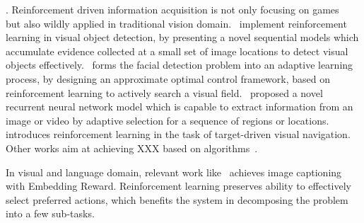 . Reinforcement driven information acquisition is not only focusing on games~\cite{NIPS2017_7084,NIPS2002_2171,NIPS2017_7007} but also wildly applied in traditional vision domain.~\cite{DBLP:conf/cvpr/MathePS16} implement reinforcement learning in visual object detection, by presenting a novel sequential
models which accumulate evidence collected at a small set of
image locations to detect visual objects effectively.~\cite{DBLP:conf/cvpr/GoodrichA12} forms the facial detection problem into an adaptive learning process, by designing an approximate optimal control framework, based on reinforcement learning to actively search a visual field.~\cite{DBLP:conf/nips/MnihHGK14} proposed a novel recurrent neural network model which is capable to extract information from an image or video by adaptive selection for a sequence of regions or locations.~\cite{zhu2017icra} introduces reinforcement learning in the task of target-driven visual navigation. Other works aim at achieving {\color{red}XXX} based on algorithms~\cite{5596468,DBLP:conf/aaai/AbtahiF11}.

In visual and language domain, relevant work like~\cite{DBLP:conf/cvpr/RenWZLL17} achieves image captioning with Embedding Reward. Reinforcement learning preserves ability to effectively select preferred actions, which benefits the system in decomposing the problem into a few sub-tasks.




